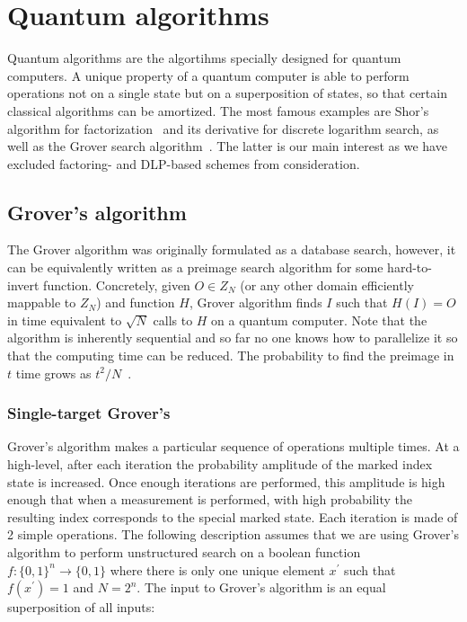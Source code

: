\section{ Quantum algorithms}

Quantum algorithms are the algortihms specially designed for quantum computers. A unique property of a quantum computer is  able to perform  operations not on a single state but on   a superposition of states, so that certain classical algorithms can be amortized. The most famous examples are Shor's algorithm for factorization~\cite{DBLP:conf/focs/Shor94}
and its derivative for discrete logarithm search, as well as the Grover search algorithm~\cite{DBLP:conf/stoc/Grover96}. The latter is our main interest as we have excluded factoring- and DLP-based schemes from consideration.

\subsection{Grover's algorithm}

The Grover algorithm was originally formulated as a database search, however, it can be equivalently written as a preimage search algorithm for some hard-to-invert function.  Concretely, given $O\in Z_N$ (or any other domain efficiently mappable to $Z_N$) and function $H$, Grover algorithm finds $I$ such that $H(I)=O$ in time equivalent to $\sqrt{N}$ calls to $H$ on a quantum computer. Note that the algorithm is inherently sequential and so far no one knows how to parallelize it so that the computing time can be reduced. The probability to find the preimage in $t$ time grows as $t^2/N$~\cite{DBLP:journals/sigact/BrassardHT97}.

\subsubsection{Single-target Grover's}

Grover's algorithm makes a particular sequence of operations multiple times. At a high-level, after each iteration the probability amplitude of the marked index state is increased. Once enough iterations are performed, this amplitude is high enough that when a measurement is performed, with high probability the resulting index corresponds to the special marked state. Each iteration is made of 2 simple operations. The following description assumes that we are using Grover's algorithm to perform unstructured search on a boolean function $f: \{0, 1\}^n \rightarrow \{0, 1\}$ where there is only one unique element $x^\prime$ such that $f(x^\prime) = 1$ and $N = 2^n$. The input to Grover's algorithm is an equal superposition of all inputs:

